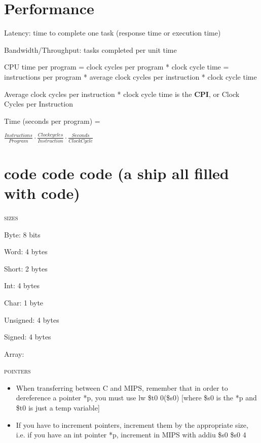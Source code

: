 \documentclass{article}
\begin{document}
\section{Performance} %
\label{sec:performance}

Latency: time to complete one task (response time or execution time)

Bandwidth/Throughput: tasks completed per unit time

CPU time per program = clock cycles per program * clock cycle time = instructions per program * average clock cycles per instruction * clock cycle time

Average clock cycles per instruction * clock cycle time is the {\bf CPI}, or Clock Cycles per Instruction 

Time (seconds per program) = 
\begin{center}$\frac{Instructions}{Program} \cdot \frac{Clock cycles}{Instruction} \cdot \frac{Seconds}{Clock Cycle} $\end{center}


\section{code code code (a ship all filled with code)} %
\label{sec:code_code_code_a_ship_all_filled_with_code_}

\begin{center}\textsc{sizes}\end{center} 
Byte: 8 bits

Word: 4 bytes

Short: 2 bytes

Int: 4 bytes

Char: 1 byte

Unsigned: 4 bytes

Signed: 4 bytes

Array: 

\begin{center}\textsc{pointers}\end{center} 
\begin{itemize}
	\item When transferring between C and MIPS, remember that in order to dereference a pointer *p, you must use lw \$t0 0(\$s0) [where \$s0 is the *p and \$t0 is just a temp variable]

\item If you have to increment pointers, increment them by the appropriate size, i.e. if you have an int pointer *p, increment in MIPS with addiu \$s0 \$s0 4


\end{itemize}
\end{document}
